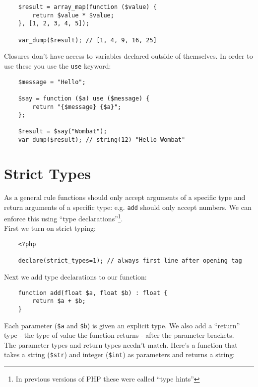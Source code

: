 \begin{verbatim}
    $result = array_map(function ($value) {
        return $value * $value;
    }, [1, 2, 3, 4, 5]);

    var_dump($result); // [1, 4, 9, 16, 25]
\end{verbatim}

Closures don't have access to variables declared outside of themselves. In order to use these you use the \texttt{use} keyword:

\begin{verbatim}
    $message = "Hello";

    $say = function ($a) use ($message) {
        return "{$message} {$a}";
    };

    $result = $say("Wombat");
    var_dump($result); // string(12) "Hello Wombat"
\end{verbatim}


\section{Strict Types}

As a general rule functions should only accept arguments of a specific type and return arguments of a specific type: e.g. \texttt{add} should only accept numbers. We can enforce this using ``type declarations''\footnote{In previous versions of PHP these were called ``type hints''}.
\\

First we turn on strict typing:

\begin{verbatim}
    <?php

    declare(strict_types=1); // always first line after opening tag
\end{verbatim}

Next we add type declarations to our function:

\begin{verbatim}
    function add(float $a, float $b) : float {
        return $a + $b;
    }
\end{verbatim}

Each parameter (\texttt{\$a} and \texttt{\$b}) is given an explicit type. We also add a ``return'' type - the type of value the function returns - after the parameter brackets.
\\

The parameter types and return types needn't match. Here's a function that takes a string (\texttt{\$str}) and integer (\texttt{\$int}) as parameters and returns a string:

